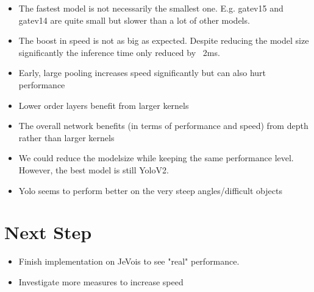 \documentclass{article}
\begin{document}
\begin{itemize}
	
	\item The fastest model is not necessarily the smallest one. E.g. gatev15 and gatev14 are quite small but slower than a lot of other models.
	
	\item The boost in speed is not as big as expected. Despite reducing the model size significantly the inference time only reduced by ~2ms.
	
	\item Early, large pooling increases speed significantly but can also hurt performance
	
	\item Lower order layers benefit from larger kernels
	
	\item The overall network benefits (in terms of performance and speed) from depth rather than larger kernels
	
	\item We could reduce the modelsize while keeping the same performance level. However, the best model is still YoloV2.
	
	\item Yolo seems to perform better on the very steep angles/difficult objects
\end{itemize}

\section{Next Step}

\begin{itemize}
	\item Finish implementation on JeVois to see "real" performance.
	\item Investigate more measures to increase speed
\end{itemize}
\end{document}
